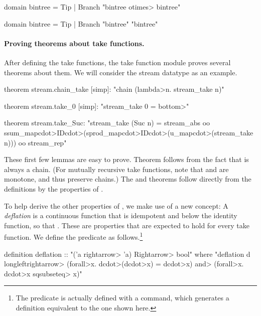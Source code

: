 \begin{isacode}
domain bintree = Tip | Branch "bintree \<otimes> bintree"
\end{isacode}
\unmedskip
\begin{isacode}
domain bintree = Tip | Branch "bintree" "bintree"
\end{isacode}
\unmedskip

\paragraph{Proving theorems about take functions.} After defining the take functions, the take function module proves several theorems about them. We will consider the stream datatype as an example.
%
\begin{isacode}
theorem stream.chain_take [simp]: "chain (\<lambda>n. stream_take n)"
\end{isacode}
\unmedskip
{}
\begin{isacode}
theorem stream.take_0 [simp]: "stream_take 0 = \<bottom>"
\end{isacode}
\unmedskip
{}
\begin{isacode}
theorem stream.take_Suc: "stream_take (Suc n) = stream_abs oo
  ssum_map\<cdot>ID\<cdot>(sprod_map\<cdot>ID\<cdot>(u_map\<cdot>(stream_take n))) oo stream_rep"
\end{isacode}
%
These first few lemmas are easy to prove. Theorem  follows from the fact that  is always a chain. (For mutually recursive take functions, note that  and  are monotone, and thus preserve chains.) The  and  theorems follow directly from the definitions by the properties of .

To help derive the other properties of , we make use of a new concept: A \emph{deflation} is a continuous function  that is idempotent and below the identity function, so that . These are properties that are expected to hold for every take function. We define the  predicate as follows.\footnote{The  predicate is actually defined with a  command, which generates a definition equivalent to the one shown here.}

\begin{isacode}
definition deflation :: "('a \<rightarrow> 'a) \<Rightarrow> bool"
  where "deflation d \<longleftrightarrow> (\<forall>x. d\<cdot>(d\<cdot>x) = d\<cdot>x) \<and> (\<forall>x. d\<cdot>x \<sqsubseteq> x)"
\end{isacode}


